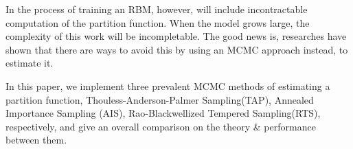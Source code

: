In the process of training an RBM, however, will include incontractable computation of the partition function. When the model grows large, the complexity of this work will be incompletable. The good news is, researches have shown that there are ways to avoid this by using an MCMC approach instead, to estimate it.

In this paper, we implement three prevalent MCMC methods of estimating a partition function, Thouless-Anderson-Palmer Sampling(TAP)\cite{gabrie2015training}, Annealed Importance Sampling (AIS)\cite{neal2001annealed,salakhutdinov2009learning}, Rao-Blackwellized Tempered Sampling(RTS)\cite{carlson2016partition}, respectively, and give an overall comparison on the theory \& performance between them.




